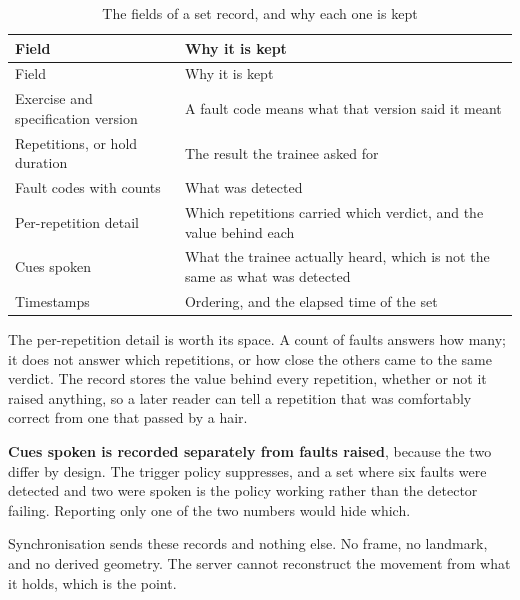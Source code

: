 {\small
\setlength{\LTpre}{6pt}\setlength{\LTpost}{8pt}
\begin{longtable}{>{\raggedright\arraybackslash}p{}>{\raggedright\arraybackslash}p{}}
\caption{The fields of a set record, and why each one is kept}\\
\toprule
Field & Why it is kept \\
\midrule
\endfirsthead
\toprule
Field & Why it is kept \\
\midrule
\endhead
\bottomrule
\endfoot
\bottomrule
\endlastfoot
Exercise and specification version & A fault code means what that version said it meant \\
Repetitions, or hold duration & The result the trainee asked for \\
Fault codes with counts & What was detected \\
Per-repetition detail & Which repetitions carried which verdict, and the value behind each \\
Cues spoken & What the trainee actually heard, which is not the same as what was detected \\
Timestamps & Ordering, and the elapsed time of the set \\
\end{longtable}
}

The per-repetition detail is worth its space. A count of faults answers how many; it does not answer which repetitions, or how close the others came to the same verdict. The record stores the value behind every repetition, whether or not it raised anything, so a later reader can tell a repetition that was comfortably correct from one that passed by a hair.

\textbf{Cues spoken is recorded separately from faults raised}, because the two differ by design. The trigger policy suppresses, and a set where six faults were detected and two were spoken is the policy working rather than the detector failing. Reporting only one of the two numbers would hide which.

Synchronisation sends these records and nothing else. No frame, no landmark, and no derived geometry. The server cannot reconstruct the movement from what it holds, which is the point.
